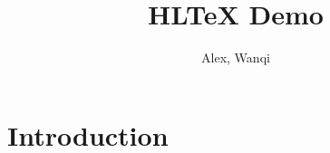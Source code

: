 \documentclass{article}
\title{HLTeX Demo}
\author{Alex, Wanqi}
\begin{document}
\section{Introduction}
\end{document}
